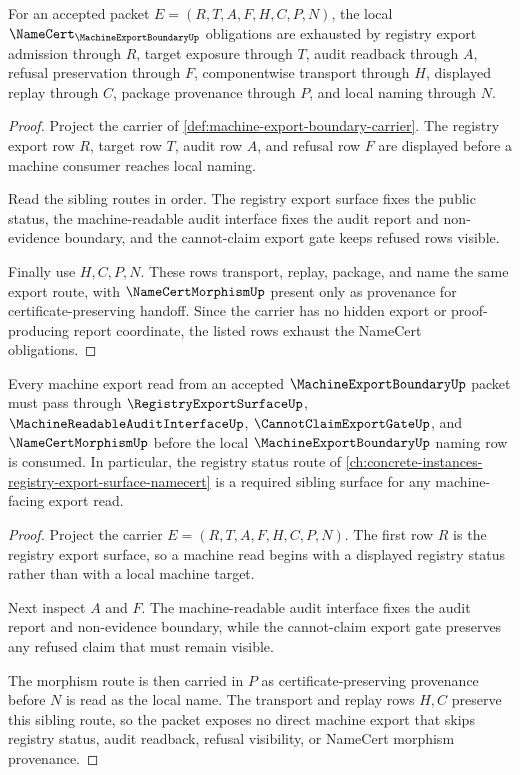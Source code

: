 \begin{theorem}
\label{thm:machine-export-boundary-namecert-obligations}
For an accepted packet $E=(R,T,A,F,H,C,P,N)$, the local $\NameCert_{\MachineExportBoundaryUp}$ obligations are exhausted by registry export admission through $R$, target exposure through $T$, audit readback through $A$, refusal preservation through $F$, componentwise transport through $H$, displayed replay through $C$, package provenance through $P$, and local naming through $N$.
\end{theorem}
\begin{proof}
Project the carrier of \autoref{def:machine-export-boundary-carrier}. The registry export row $R$, target row $T$, audit row $A$, and refusal row $F$ are displayed before a machine consumer reaches local naming.

Read the sibling routes in order. The registry export surface fixes the public status, the machine-readable audit interface fixes the audit report and non-evidence boundary, and the cannot-claim export gate keeps refused rows visible.

Finally use $H,C,P,N$. These rows transport, replay, package, and name the same export route, with $\NameCertMorphismUp$ present only as provenance for certificate-preserving handoff. Since the carrier has no hidden export or proof-producing report coordinate, the listed rows exhaust the NameCert obligations.
\end{proof}

\begin{theorem}
\label{thm:machine-export-boundary-registry-route}
Every machine export read from an accepted $\MachineExportBoundaryUp$ packet must pass through $\RegistryExportSurfaceUp$, $\MachineReadableAuditInterfaceUp$, $\CannotClaimExportGateUp$, and $\NameCertMorphismUp$ before the local $\MachineExportBoundaryUp$ naming row is consumed. In particular, the registry status route of \autoref{ch:concrete-instances-registry-export-surface-namecert} is a required sibling surface for any machine-facing export read.
\end{theorem}
\begin{proof}
Project the carrier $E=(R,T,A,F,H,C,P,N)$. The first row $R$ is the registry export surface, so a machine read begins with a displayed registry status rather than with a local machine target.

Next inspect $A$ and $F$. The machine-readable audit interface fixes the audit report and non-evidence boundary, while the cannot-claim export gate preserves any refused claim that must remain visible.

The morphism route is then carried in $P$ as certificate-preserving provenance before $N$ is read as the local name. The transport and replay rows $H,C$ preserve this sibling route, so the packet exposes no direct machine export that skips registry status, audit readback, refusal visibility, or NameCert morphism provenance.
\end{proof}

